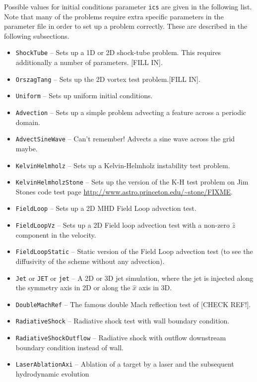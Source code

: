 \documentclass[a4paper,11pt]{report}
\begin{document}
Possible values for initial conditions parameter \lstinline|ics| are given in the following list.  Note that many of the problems require extra specific parameters in the parameter file in order to set up a problem correctly.  These are described in the following subsections.
\begin{itemize}
  \item \lstinline|ShockTube| -- Sets up a 1D or 2D shock-tube problem.
  This requires additionally a number of parameters. [FILL IN].
  \item \lstinline|OrszagTang| -- Sets up the 2D \citet{OrsTan79} vortex test problem.[FILL IN].
  \item \lstinline|Uniform| -- Sets up uniform initial conditions.
  \item \lstinline|Advection| -- Sets up a simple problem advecting a feature across a periodic domain.
  \item \lstinline|AdvectSineWave| -- Can't remember! Advects a sine wave across the grid maybe.
  \item \lstinline|KelvinHelmholz| -- Sets up a Kelvin-Helmholz instability test problem.
  \item \lstinline|KelvinHelmholzStone| -- Sets up the version of the K-H test problem on Jim Stones code test page \url{http://www.astro.princeton.edu/~stone/FIXME}.
  \item \lstinline|FieldLoop| -- Sets up a 2D MHD Field Loop advection test.
  \item \lstinline|FieldLoopVz| -- Sets up a 2D Field loop advection test with a non-zero $\hat{z}$ component in the velocity.
  \item \lstinline|FieldLoopStatic| -- Static version of the Field Loop advection test (to see the diffusivity of the scheme without any advection).
  \item \lstinline|Jet| or \lstinline|JET| or \lstinline|jet| -- A 2D or 3D jet simulation, where the jet is injected along the symmetry axis in 2D or along the $\hat{x}$ axis in 3D.
  \item \lstinline|DoubleMachRef| -- The famous double Mach reflection test of \citet{ColWoo84} [CHECK REF!].
  \item \lstinline|RadiativeShock| -- Radiative shock test \citep[e.g.][]{InnGidFal87b} with wall boundary condition.
  \item \lstinline|RadiativeShockOutflow| -- Radiative shock with outflow downstream boundary condition instead of wall.
  \item \lstinline|LaserAblationAxi| -- Ablation of a target by a laser and the subsequent hydrodynamic evolution

\end{itemize}
\end{document}
